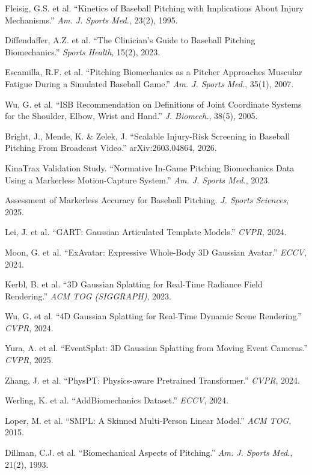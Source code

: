 \documentclass[11pt, a4paper]{report}
\begin{document}
\begin{enumerate}[leftmargin=*, label={[\arabic*]}]
  \item Fleisig, G.S. et al. ``Kinetics of Baseball Pitching with Implications About Injury Mechanisms.'' \textit{Am. J. Sports Med.}, 23(2), 1995.

  \item Diffendaffer, A.Z. et al. ``The Clinician's Guide to Baseball Pitching Biomechanics.'' \textit{Sports Health}, 15(2), 2023.

  \item Escamilla, R.F. et al. ``Pitching Biomechanics as a Pitcher Approaches Muscular Fatigue During a Simulated Baseball Game.'' \textit{Am. J. Sports Med.}, 35(1), 2007.

  \item Wu, G. et al. ``ISB Recommendation on Definitions of Joint Coordinate Systems for the Shoulder, Elbow, Wrist and Hand.'' \textit{J. Biomech.}, 38(5), 2005.

  \item Bright, J., Mende, K. \& Zelek, J. ``Scalable Injury-Risk Screening in Baseball Pitching From Broadcast Video.'' arXiv:2603.04864, 2026.

  \item KinaTrax Validation Study. ``Normative In-Game Pitching Biomechanics Data Using a Markerless Motion-Capture System.'' \textit{Am. J. Sports Med.}, 2023.

  \item Assessment of Markerless Accuracy for Baseball Pitching. \textit{J. Sports Sciences}, 2025.

  \item Lei, J. et al. ``GART: Gaussian Articulated Template Models.'' \textit{CVPR}, 2024.

  \item Moon, G. et al. ``ExAvatar: Expressive Whole-Body 3D Gaussian Avatar.'' \textit{ECCV}, 2024.

  \item Kerbl, B. et al. ``3D Gaussian Splatting for Real-Time Radiance Field Rendering.'' \textit{ACM TOG (SIGGRAPH)}, 2023.

  \item Wu, G. et al. ``4D Gaussian Splatting for Real-Time Dynamic Scene Rendering.'' \textit{CVPR}, 2024.

  \item Yura, A. et al. ``EventSplat: 3D Gaussian Splatting from Moving Event Cameras.'' \textit{CVPR}, 2025.

  \item Zhang, J. et al. ``PhysPT: Physics-aware Pretrained Transformer.'' \textit{CVPR}, 2024.

  \item Werling, K. et al. ``AddBiomechanics Dataset.'' \textit{ECCV}, 2024.

  \item Loper, M. et al. ``SMPL: A Skinned Multi-Person Linear Model.'' \textit{ACM TOG}, 2015.

  \item Dillman, C.J. et al. ``Biomechanical Aspects of Pitching.'' \textit{Am. J. Sports Med.}, 21(2), 1993.
\end{enumerate}
\end{document}
